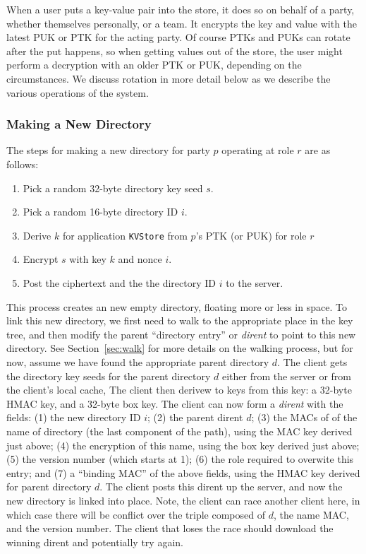 When a user puts a key-value pair into the store, it does so on behalf of a party,
whether themselves personally, or a team. It encrypts the key and value with the latest
PUK or PTK for the acting party. Of course PTKs and PUKs can rotate after the put
happens, so when getting values out of the store, the user might perform a decryption
with an older PTK or PUK, depending on the circumstances. We discuss rotation in
more detail below as we describe the various operations of the system.

\subsubsection{Making a New Directory}

The steps for making a new directory for party $p$ operating at role $r$ are as follows:

\begin{enumerate}
    \item Pick a random 32-byte directory key seed $s$.
    \item Pick a random 16-byte directory ID $i$.
    \item Derive $k$ for application \texttt{KVStore} from $p$'s PTK (or PUK) for role $r$
    \item Encrypt $s$ with key $k$ and nonce $i$.
    \item Post the ciphertext and the the directory ID $i$ to the server.
\end{enumerate}
%
This process creates an new empty directory, floating more or less in space. To link this 
new directory, we first need to walk to the appropriate place in the key tree, and then
modify the parent ``directory entry'' or \textit{dirent} to point to this new directory.
See Section~\ref{sec:walk} for more details on the walking process, but for now, assume
we have found the appropriate parent directory $d$. The client gets the directory key
seeds for the parent directory $d$ either from the server or from the client's local cache,
The client then derivew to keys from this key: a 32-byte HMAC key, and a 32-byte box key.
The client can now form a \textit{dirent} with the fields: (1) the new directory ID $i$; (2)
the parent dirent $d$; (3) the MACs of of the name of directory (the last component of the path),
using the MAC key derived just above; (4) the encryption of this name, using the box key
derived just above; (5) the version number (which starts at 1); (6) the role required to
overwite this entry; and (7) a ``binding MAC'' of the above fields, using the HMAC
key derived for parent directory $d$. The client posts this dirent up the server, and now
the new directory is linked into place. Note, the client can race another client here,
in which case there will be conflict over the triple composed of $d$, the name MAC, and 
the version number. The client that loses the race should download the winning dirent
and potentially try again.

